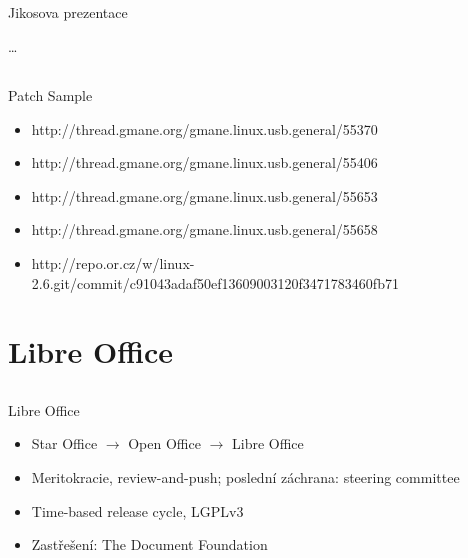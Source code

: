 \documentclass{beamer}
\begin{document}
\subsection{}
\begin{frame}{Jikosova prezentace}
\begin{center}
	\dots
\end{center}
\end{frame}

\subsection{}
\begin{frame}{Patch Sample}
\begin{center}
\begin{itemize}
\item http://thread.gmane.org/gmane.linux.usb.general/55370
\item http://thread.gmane.org/gmane.linux.usb.general/55406
\item http://thread.gmane.org/gmane.linux.usb.general/55653
\item http://thread.gmane.org/gmane.linux.usb.general/55658
\item http://repo.or.cz/w/linux-2.6.git/commit/c91043adaf50ef13609003120f3471783460fb71
\end{itemize}
\end{center}
\end{frame}


\section{Libre Office}

\subsection{}
\begin{frame}{Libre Office}
\begin{itemize}
\item Star Office $\rightarrow$ Open Office $\rightarrow$ Libre Office
\item Meritokracie, review-and-push; poslední záchrana: steering committee
\item Time-based release cycle, LGPLv3
\item Zastřešení: The Document Foundation
\end{itemize}
\end{frame}
\end{document}
